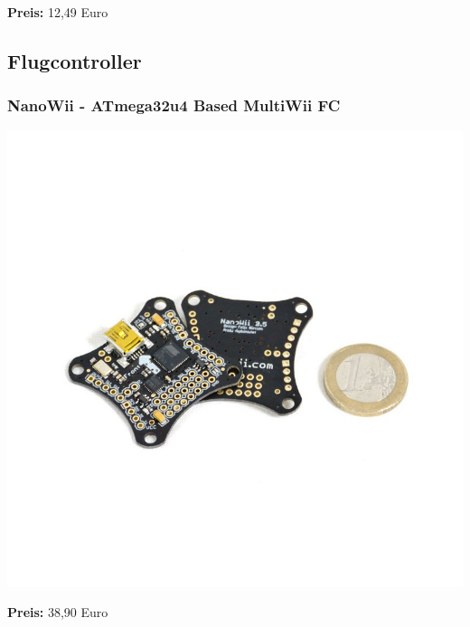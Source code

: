 \documentclass[12pt,a4paper]{article}
\begin{document}
\textbf{Preis:} 12,49 Euro

\subsection*{Flugcontroller}

\subsubsection*{NanoWii - ATmega32u4 Based MultiWii FC}
\includegraphics[scale=0.4]{Bilder/NanoWii.jpg}

\textbf{Preis:} 38,90 Euro
\end{document}
